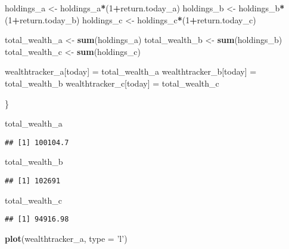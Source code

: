 \documentclass[]{article}
\newenvironment{Shaded}{\begin{snugshade}}{\end{snugshade}}
\newcommand{\DataTypeTok}[1]{\textcolor[rgb]{0.13,0.29,0.53}{#1}}
\newcommand{\DecValTok}[1]{\textcolor[rgb]{0.00,0.00,0.81}{#1}}
\newcommand{\KeywordTok}[1]{\textcolor[rgb]{0.13,0.29,0.53}{\textbf{#1}}}
\newcommand{\NormalTok}[1]{#1}
\newcommand{\OperatorTok}[1]{\textcolor[rgb]{0.81,0.36,0.00}{\textbf{#1}}}
\newcommand{\StringTok}[1]{\textcolor[rgb]{0.31,0.60,0.02}{#1}}
\begin{document}
\begin{Shaded}
\begin{Highlighting}[]
\NormalTok{  holdings_a <-}\StringTok{ }\NormalTok{holdings_a}\OperatorTok{*}\NormalTok{(}\DecValTok{1}\OperatorTok{+}\NormalTok{return.today_a)}
\NormalTok{  holdings_b <-}\StringTok{ }\NormalTok{holdings_b}\OperatorTok{*}\NormalTok{(}\DecValTok{1}\OperatorTok{+}\NormalTok{return.today_b)}
\NormalTok{  holdings_c <-}\StringTok{ }\NormalTok{holdings_c}\OperatorTok{*}\NormalTok{(}\DecValTok{1}\OperatorTok{+}\NormalTok{return.today_c)}
  
\NormalTok{  total_wealth_a <-}\StringTok{ }\KeywordTok{sum}\NormalTok{(holdings_a)}
\NormalTok{  total_wealth_b <-}\StringTok{ }\KeywordTok{sum}\NormalTok{(holdings_b)}
\NormalTok{  total_wealth_c <-}\StringTok{ }\KeywordTok{sum}\NormalTok{(holdings_c)}
  
\NormalTok{  wealthtracker_a[today] =}\StringTok{ }\NormalTok{total_wealth_a}
\NormalTok{  wealthtracker_b[today] =}\StringTok{ }\NormalTok{total_wealth_b}
\NormalTok{  wealthtracker_c[today] =}\StringTok{ }\NormalTok{total_wealth_c}
  
\NormalTok{\}}

\NormalTok{total_wealth_a}
\end{Highlighting}
\end{Shaded}

\begin{verbatim}
## [1] 100104.7
\end{verbatim}

\begin{Shaded}
\begin{Highlighting}[]
\NormalTok{total_wealth_b}
\end{Highlighting}
\end{Shaded}

\begin{verbatim}
## [1] 102691
\end{verbatim}

\begin{Shaded}
\begin{Highlighting}[]
\NormalTok{total_wealth_c}
\end{Highlighting}
\end{Shaded}

\begin{verbatim}
## [1] 94916.98
\end{verbatim}

\begin{Shaded}
\begin{Highlighting}[]
\KeywordTok{plot}\NormalTok{(wealthtracker_a, }\DataTypeTok{type =} \StringTok{'l'}\NormalTok{)}
\end{Highlighting}
\end{Shaded}
\end{document}
